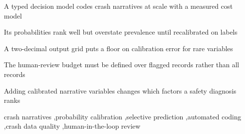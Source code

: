 \documentclass[a4paper,fleqn]{cas-sc}
\begin{document}
\begin{highlights}
\item A typed decision model codes crash narratives at scale with a measured cost model
\item Its probabilities rank well but overstate prevalence until recalibrated on labels
\item A two-decimal output grid puts a floor on calibration error for rare variables
\item The human-review budget must be defined over flagged records rather than all records
\item Adding calibrated narrative variables changes which factors a safety diagnosis ranks
\end{highlights}

\begin{keywords}
crash narratives \sep probability calibration \sep selective prediction \sep automated coding
\sep crash data quality \sep human-in-the-loop review
\end{keywords}

\maketitle




\end{document}

